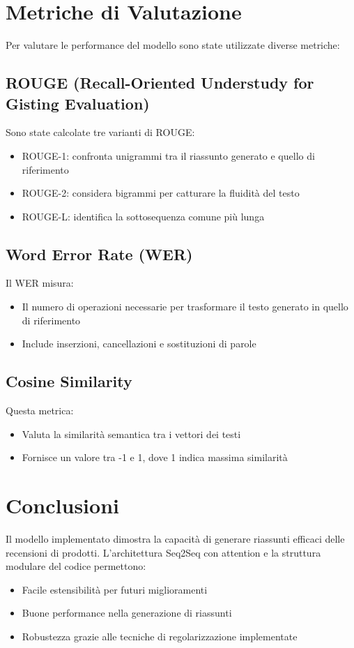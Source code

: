\documentclass[a4paper, 12pt]{article}
\begin{document}
\section{Metriche di Valutazione}
Per valutare le performance del modello sono state utilizzate diverse metriche:

\subsection{ROUGE (Recall-Oriented Understudy for Gisting Evaluation)}
Sono state calcolate tre varianti di ROUGE:
\begin{itemize}
    \item ROUGE-1: confronta unigrammi tra il riassunto generato e quello di riferimento
    \item ROUGE-2: considera bigrammi per catturare la fluidità del testo
    \item ROUGE-L: identifica la sottosequenza comune più lunga
\end{itemize}

\subsection{Word Error Rate (WER)}
Il WER misura:
\begin{itemize}
    \item Il numero di operazioni necessarie per trasformare il testo generato in quello di riferimento
    \item Include inserzioni, cancellazioni e sostituzioni di parole
\end{itemize}

\subsection{Cosine Similarity}
Questa metrica:
\begin{itemize}
    \item Valuta la similarità semantica tra i vettori dei testi
    \item Fornisce un valore tra -1 e 1, dove 1 indica massima similarità
\end{itemize}

\section{Conclusioni}
Il modello implementato dimostra la capacità di generare riassunti efficaci delle recensioni di prodotti. L'architettura Seq2Seq con attention e la struttura modulare del codice permettono:
\begin{itemize}
    \item Facile estensibilità per futuri miglioramenti
    \item Buone performance nella generazione di riassunti
    \item Robustezza grazie alle tecniche di regolarizzazione implementate
\end{itemize}
\end{document}
